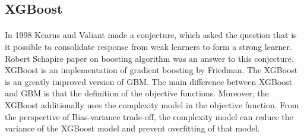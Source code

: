 \documentclass[runningheads]{llncs}
\begin{document}
\subsection{XGBoost}
\paragraph{ }In 1998 Kearns and Valiant made a conjecture, which asked the question that is it possible to consolidate response from weak learners to form a strong learner. Robert Schapire paper on boosting algorithm was an answer to this conjecture. XGBoost is an implementation of gradient boosting by Friedman. The XGBoost is an greatly improved version of GBM. The main difference between XGBoost and GBM is that the definition of the objective functions. Moreover, the XGBoost additionally uses the complexity model in the objective function. From the perspective of Bias-variance trade-off, the complexity model can reduce the variance of the XGBoost model and prevent overfitting of that model.

\end{document}

